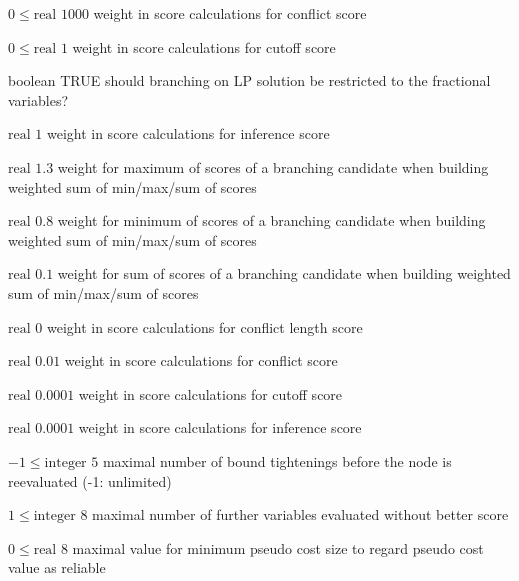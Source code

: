 %
{$0\leq\textrm{real}$}%
{$1000$}%
{weight in score calculations for conflict score}%
{}

%
{$0\leq\textrm{real}$}%
{$1$}%
{weight in score calculations for cutoff score}%
{}

%
{boolean}%
{TRUE}%
{should branching on LP solution be restricted to the fractional variables?}%
{}

%
{$\textrm{real}$}%
{$1$}%
{weight in score calculations for inference score}%
{}

%
{$\textrm{real}$}%
{$1.3$}%
{weight for maximum of scores of a branching candidate when building weighted sum of min/max/sum of scores}%
{}

%
{$\textrm{real}$}%
{$0.8$}%
{weight for minimum of scores of a branching candidate when building weighted sum of min/max/sum of scores}%
{}

%
{$\textrm{real}$}%
{$0.1$}%
{weight for sum of scores of a branching candidate when building weighted sum of min/max/sum of scores}%
{}

%
{$\textrm{real}$}%
{$0$}%
{weight in score calculations for conflict length score}%
{}

%
{$\textrm{real}$}%
{$0.01$}%
{weight in score calculations for conflict score}%
{}

%
{$\textrm{real}$}%
{$0.0001$}%
{weight in score calculations for cutoff score}%
{}

%
{$\textrm{real}$}%
{$0.0001$}%
{weight in score calculations for inference score}%
{}

%
{$-1\leq\textrm{integer}$}%
{$5$}%
{maximal number of bound tightenings before the node is reevaluated (-1: unlimited)}%
{}

%
{$1\leq\textrm{integer}$}%
{$8$}%
{maximal number of further variables evaluated without better score}%
{}

%
{$0\leq\textrm{real}$}%
{$8$}%
{maximal value for minimum pseudo cost size to regard pseudo cost value as reliable}%
{}

